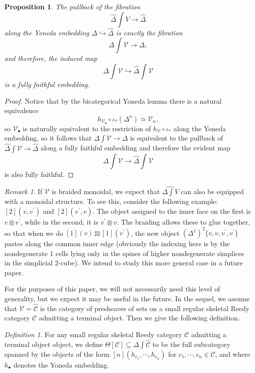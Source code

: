 \documentclass{amsart}
\numberwithin{equation}{section}
\theoremstyle{plain}   %
\newtheorem{prop}[subsection]{Proposition}
\theoremstyle{remark}
\newtheorem{rem}[subsection]{Remark}
\newtheorem{defn}[subsection]{Definition}
\theoremstyle{plain}
\newcommand{\psh}[1]{\ensuremath{\widehat{#1}}}
\newcommand{\C}{\ensuremath{\mathcal{C}}}
\begin{document}
\begin{prop} The pullback of the fibration \[\psh{\Delta}\int V \to \psh{\Delta}\] along the Yoneda embedding \(\Delta\hookrightarrow \psh{\Delta}\) is exactly the fibration \[\Delta\int\mathcal{V}\to \Delta,\] and therefore, the induced map \[\Delta\int\mathcal{V}\hookrightarrow \psh{\Delta}\int\mathcal{V}\] is a fully faithful embedding.
\end{prop}
\begin{proof}    Notice that by the bicategorical Yoneda lemma there is a natural equivalence \[h_{\mathcal{V}_\bullet}\circ \iota_*(\Delta^n)\simeq \mathcal{V}_n,\] so \(\mathcal{V}_\bullet\) is naturally equivalent to the restriction of \(h_\mathcal{V}\circ \iota_*\) along the Yoneda embedding, so it follows that \(\Delta\int \mathcal{V} \to \Delta\) is equivalent to the pullback of \(\psh{\Delta}\int \mathcal{V} \to \psh{\Delta}\) along a fully faithful embedding and therefore the evident map \[\Delta\int \mathcal{V} \to \psh{\Delta}\int \mathcal{V}\] is also fully faithful.
\end{proof}

\begin{rem} If \(\mathcal{V}\) is braided monoidal, we expect that \(\psh{\Delta \int V}\) can also be equipped with a monoidal structure. To see this, consider the following example: \([2](v,v^\prime)\) and \([2](v^\prime,v)\).  The object assigned to the inner face on the first is \(v\otimes v^\prime\), while in the second, it is \(v^\prime\otimes v\).  The braiding allows these to glue together, so that when we do \([1](v)\boxtimes [1](v^\prime)\), the new object \((\Delta^1)^2\{v,v,v^\prime,v^\prime\}\) pastes along the common inner edge (obviously the indexing here is by the nondegenerate \(1\) cells lying only in the spines of higher nondegenerate simplices in the simplicial \(2\)-cube).  We intend to study this more general case in a future paper.
\end{rem}

For the purposes of this paper, we will not necessarily need this level of generality, but we expect it may be useful in the future. In the sequel, we assume that \(\mathcal{V}=\psh{\C}\) is the category of presheaves of sets on a small regular skeletal Reedy category \(\C\) admitting a terminal object.  Then we give the following definition.

\begin{defn} For any small regular skeletal Reedy category \(\C\) admitting a terminal object object, we define \(\Theta[\C]\subseteq \Delta \int \psh{\C}\) to be the full subcategory spanned by the objects of the form \([n](h_{c_1},\cdots, h_{c_n})\) for \(c_1,\cdots, c_n \in \C\), and where \(h_\bullet\) denotes the Yoneda embedding.
\end{defn}
\end{document}
